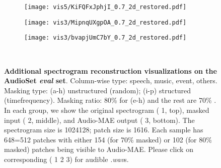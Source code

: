 \documentclass{article}
\begin{document}
{\begin{figure}[h!]
\begin{subfigure}[b]{0.245\linewidth}
        \label{fig:app:vis:m}
    \end{subfigure} 
    \begin{subfigure}[b]{0.245\linewidth}
        \texttt{[image: vis5/KiFQFxJphjI\_0.7\_2d\_restored.pdf]}
        
        \label{fig:app:vis:n}
    \end{subfigure}    
    \begin{subfigure}[b]{0.245\linewidth}
        \texttt{[image: vis3/MipnqUXgpOA\_0.7\_2d\_restored.pdf]}
        
        \label{fig:app:vis:o}
    \end{subfigure}
    \begin{subfigure}[b]{0.245\linewidth}
        \texttt{[image: vis3/bvapjUmC7bY\_0.7\_2d\_restored.pdf]}
        \label{fig:app:vis:p}
        
    \end{subfigure}   
    \\
    \vspace{1pt}
    \caption{
    \textbf{Additional spectrogram reconstruction visualizations on the AudioSet \textit{eval} set}. 
    Column-wise type: speech, music, event, others.
    Masking type: (a-h) unstructured (random); (i-p) structured (timefrequency).
    Masking ratio: 80\% for (e-h) and the rest are 70\% .
    In each group, we show the original spectrogram ({\color{hrefcolor} 1}, top), masked input ({\color{hrefcolor} 2}, middle), and Audio-MAE output ({\color{hrefcolor} 3}, bottom). 
    The spectrogram size is 1024128; patch size is 1616. Each sample has 648=512 patches with either 154 (for 70\% masked) or 102 (for 80\% masked) patches being visible to Audio-MAE. 
    Please click on corresponding ({\color{hrefcolor} 1 2 3}) for audible \emph{.wav}s.
    }
    \label{fig:app:vis}
\end{figure}
\clearpage
}
\end{document}
